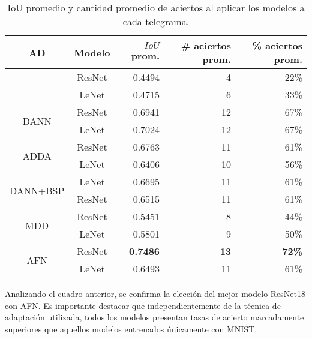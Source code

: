 \begin{table}[H]
    \centering
    \begin{tabular}{cc|rrr}
        \toprule
        AD                           & Modelo & $IoU$ prom.     & \# aciertos prom. & \% aciertos prom. \\
        \midrule
        \multirow[c]{2}{*}{-}        & ResNet & 0.4494          & 4                 & 22\%              \\
                                     & LeNet  & 0.4715          & 6                 & 33\%              \\\hline
        \multirow[c]{2}{*}{DANN}     & ResNet & 0.6941          & 12                & 67\%              \\
                                     & LeNet  & 0.7024          & 12                & 67\%              \\\hline
        \multirow[c]{2}{*}{ADDA}     & ResNet & 0.6763          & 11                & 61\%              \\
                                     & LeNet  & 0.6406          & 10                & 56\%              \\\hline
        \multirow[c]{2}{*}{DANN+BSP} & LeNet  & 0.6695          & 11                & 61\%              \\
                                     & ResNet & 0.6515          & 11                & 61\%              \\\hline
        \multirow[c]{2}{*}{MDD}      & ResNet & 0.5451          & 8                 & 44\%              \\
                                     & LeNet  & 0.5801          & 9                 & 50\%              \\\hline
        \multirow[c]{2}{*}{AFN}      & ResNet & \textbf{0.7486} & \textbf{13}       & \textbf{72\%}     \\
                                     & LeNet  & 0.6493          & 11                & 61\%              \\
        \bottomrule
    \end{tabular}
    \caption[IoU y aciertos por modelo]{IoU promedio y cantidad promedio de aciertos al aplicar los modelos a cada telegrama.}
    \label{tab:iou-cant-aciertos-en-telegramas}
\end{table}

Analizando el cuadro anterior, se confirma la elección del mejor modelo ResNet18 con AFN. Es importante destacar que
independientemente de la técnica de adaptación utilizada, todos los modelos presentan tasas de acierto marcadamente
superiores que aquellos modelos entrenados únicamente con MNIST.

